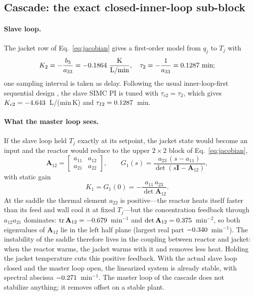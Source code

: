 

\subsection{Cascade: the exact closed-inner-loop sub-block}
\label{subsec:cascade_design}
\paragraph{Slave loop.} The jacket row of Eq.~\eqref{eq:jacobian} gives a first-order model from $q_j$ to $T_j$ with
\begin{equation}
K_2=-\frac{b_3}{a_{33}}=-0.1864~\frac{\text{K}}{\text{L/min}},\quad \tau_2=-\frac{1}{a_{33}}=0.1287~\text{min};
\end{equation}
one sampling interval is taken as delay. Following the usual inner-loop-first sequential design \cite{seborg2010process,shinskey1996process,visioli2006practical}, the slave SIMC PI is tuned with $\tau_{c2}=\tau_2$, which gives $K_{c2}=-4.643$~L/(min\,K) and $\tau_{I2}=0.1287$~min.

\paragraph{What the master loop sees.} If the slave loop held $T_j$ exactly at its setpoint, the jacket state would become an input and the reactor would reduce to the upper $2\times2$ block of Eq.~\eqref{eq:jacobian},
\begin{equation}
\mathbf{A}_{12}=\begin{bmatrix} a_{11} & a_{12}\\ a_{21} & a_{22}\end{bmatrix},\qquad
G_1(s)=\frac{a_{23}\,(s-a_{11})}{\det(s\mathbf{I}-\mathbf{A}_{12})},
\label{eq:a12}
\end{equation}
with static gain
\begin{equation}
K_1=G_1(0)=-\frac{a_{11}\,a_{23}}{\det\mathbf{A}_{12}}.
\label{eq:k1_exact}
\end{equation}
At the saddle the thermal element $a_{22}$ is positive---the reactor heats itself faster than its feed and wall cool it at fixed $T_j$---but the concentration feedback through $a_{12}a_{21}$ dominates: $\operatorname{tr}\mathbf{A}_{12}=-0.679$~min$^{-1}$ and $\det\mathbf{A}_{12}=0.375$~min$^{-2}$, so both eigenvalues of $\mathbf{A}_{12}$ lie in the left half plane (largest real part $-0.340$~min$^{-1}$). The instability of the saddle therefore lives in the coupling between reactor and jacket: when the reactor warms, the jacket warms with it and removes less heat. Holding the jacket temperature cuts this positive feedback. With the actual slave loop closed and the master loop open, the linearized system is already stable, with spectral abscissa $-0.271$~min$^{-1}$. The master loop of the cascade does not stabilize anything; it removes offset on a stable plant.

